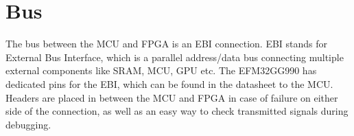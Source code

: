 \documentclass[../main/report.tex]{subfiles}
\begin{document}
\section{Bus}
The bus between the MCU and FPGA is an EBI connection.
EBI stands for External Bus Interface, which is a parallel address/data bus connecting multiple external components like SRAM, MCU, GPU etc.
The EFM32GG990 has dedicated pins for the EBI, which can be found in the datasheet \cite{EFM32-datasheet} to the MCU.
Headers are placed in between the MCU and FPGA in case of failure on either side of the connection, as well as an easy way to check transmitted signals during debugging.
\end{document}
